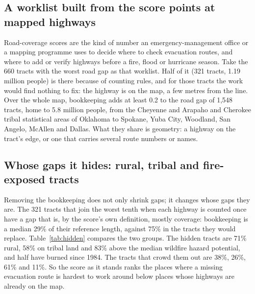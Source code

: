 \documentclass[10pt,twocolumn,a4paper]{article}
\begin{document}
\subsection{A worklist built from the score points at mapped highways}
Road-coverage scores are the kind of number an emergency-management office or a mapping programme uses to decide where to
check evacuation routes, and where to add or verify highways before a fire, flood or hurricane season. Take the 660 tracts
with the worst road gap as that worklist. Half of it (321 tracts, 1.19 million people) is there because of counting
rules, and for those tracts the work would find nothing to fix: the highway is on the map, a few metres from the line.
Over the whole map, bookkeeping adds at least 0.2 to the road gap of 1,548 tracts, home to 5.8 million people, from the
Cheyenne and Arapaho and Cherokee tribal statistical areas of Oklahoma to Spokane, Yuba City, Woodland, San Angelo,
McAllen and Dallas. What they share is geometry: a highway on the tract's edge, or one that carries several route
numbers or names.

\subsection{Whose gaps it hides: rural, tribal and fire-exposed tracts}
Removing the bookkeeping does not only shrink gaps; it changes whose gaps they are. The 321 tracts that join the worst
tenth when each highway is counted once have a gap that is, by the score's own definition, mostly coverage: bookkeeping
is a median 29\% of their reference length, against 75\% in the tracts they would replace. Table~\ref{tab:hidden}
compares the two groups. The hidden tracts are 71\% rural, 58\% on tribal land and 83\% above the median wildfire hazard
potential, and half have burned since 1984. The tracts that crowd them out are 38\%, 26\%, 61\% and 11\%. So the score as
it stands ranks the places where a missing evacuation route is hardest to work around below places whose highways are
already on the map.
\end{document}
